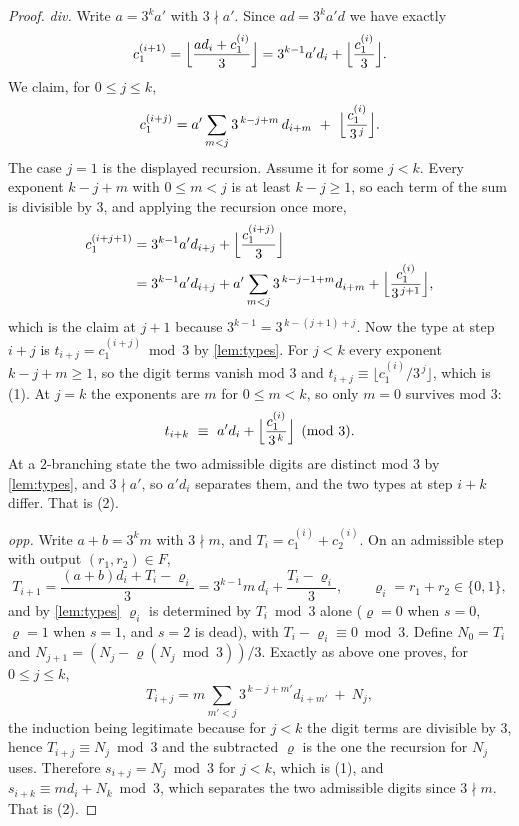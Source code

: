 \documentclass[11pt]{amsart}
\theoremstyle{definition}
\theoremstyle{remark}
\begin{document}
\begin{proof}
\emph{div.} Write $a = 3^k a'$ with $3 \nmid a'$. Since $ad = 3^k a' d$ we have exactly
\[
  c_1^{(i+1)} = \Bigl\lfloor \frac{a d_i + c_1^{(i)}}{3} \Bigr\rfloor = 3^{k-1} a' d_i + \Bigl\lfloor \frac{c_1^{(i)}}{3} \Bigr\rfloor .
\]
We claim, for $0 \le j \le k$,
\[
  c_1^{(i+j)} = a' \sum_{m < j} 3^{\,k-j+m}\, d_{i+m} \ + \ \Bigl\lfloor \frac{c_1^{(i)}}{3^{\,j}} \Bigr\rfloor .
\]
The case $j = 1$ is the displayed recursion. Assume it for some $j < k$. Every exponent $k-j+m$ with $0 \le m < j$ is at least $k - j \ge 1$, so each term of the sum is divisible by $3$, and applying the recursion once more,
\begin{align*}
  c_1^{(i+j+1)} &= 3^{k-1}a' d_{i+j} + \Bigl\lfloor \frac{c_1^{(i+j)}}{3} \Bigr\rfloor \\
   &= 3^{k-1} a' d_{i+j} + a' \sum_{m<j} 3^{\,k-j-1+m} d_{i+m} + \Bigl\lfloor \frac{c_1^{(i)}}{3^{\,j+1}} \Bigr\rfloor ,
\end{align*}
which is the claim at $j+1$ because $3^{k-1} = 3^{\,k-(j+1)+j}$. Now the type at step $i+j$ is $t_{i+j} = c_1^{(i+j)} \bmod 3$ by \cref{lem:types}. For $j < k$ every exponent $k-j+m \ge 1$, so the digit terms vanish mod $3$ and $t_{i+j} \equiv \lfloor c_1^{(i)}/3^{\,j} \rfloor$, which is (1). At $j = k$ the exponents are $m$ for $0 \le m < k$, so only $m = 0$ survives mod $3$:
\[
  t_{i+k} \ \equiv \ a' d_i + \Bigl\lfloor \frac{c_1^{(i)}}{3^{\,k}} \Bigr\rfloor \pmod 3 .
\]
At a $2$-branching state the two admissible digits are distinct mod $3$ by \cref{lem:types}, and $3 \nmid a'$, so $a'd_i$ separates them, and the two types at step $i+k$ differ. That is (2).

\emph{opp.} Write $a + b = 3^k m$ with $3 \nmid m$, and $T_i = c_1^{(i)} + c_2^{(i)}$. On an admissible step with output $(r_1,r_2) \in F$,
\[
  T_{i+1} = \frac{(a+b)d_i + T_i - \varrho_i}{3} = 3^{k-1} m\, d_i + \frac{T_i - \varrho_i}{3}, \qquad \varrho_i = r_1 + r_2 \in \{0,1\} ,
\]
and by \cref{lem:types} $\varrho_i$ is determined by $T_i \bmod 3$ alone ($\varrho = 0$ when $s = 0$, $\varrho = 1$ when $s = 1$, and $s = 2$ is dead), with $T_i - \varrho_i \equiv 0 \bmod 3$. Define $N_0 = T_i$ and $N_{j+1} = (N_j - \varrho(N_j \bmod 3))/3$. Exactly as above one proves, for $0 \le j \le k$,
\[
  T_{i+j} = m \sum_{m' < j} 3^{\,k-j+m'} d_{i+m'} \ + \ N_j ,
\]
the induction being legitimate because for $j < k$ the digit terms are divisible by $3$, hence $T_{i+j} \equiv N_j \bmod 3$ and the subtracted $\varrho$ is the one the recursion for $N_j$ uses. Therefore $s_{i+j} = N_j \bmod 3$ for $j < k$, which is (1), and $s_{i+k} \equiv m d_i + N_k \bmod 3$, which separates the two admissible digits since $3 \nmid m$. That is (2).
\end{proof}
\end{document}
